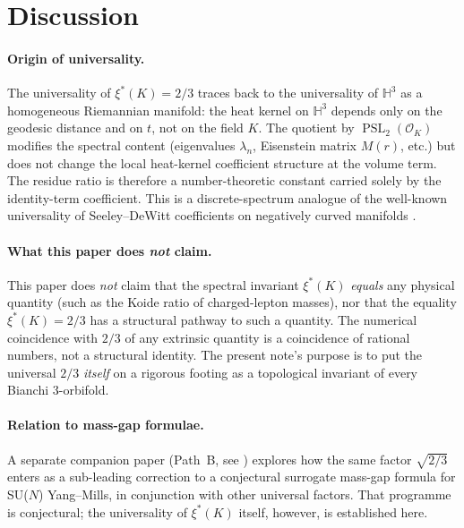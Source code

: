 \documentclass[11pt,a4paper,reqno]{amsart}
\theoremstyle{definition}
\DeclareMathOperator{\PSL}{PSL}
\newcommand{\OK}{\mathcal{O}_K}
\newcommand{\HH}{\mathbb{H}}
\newcommand{\xis}{\xi^{*}}
\begin{document}
\section{Discussion}\label{sec:discussion}

\paragraph{Origin of universality.}
The universality of $\xis(K)=2/3$ traces back to the universality of $\HH^3$ as a homogeneous Riemannian manifold: the heat kernel on $\HH^3$ depends only on the geodesic distance and on $t$, not on the field $K$. The quotient by $\PSL_2(\OK)$ modifies the spectral content (eigenvalues $\lambda_n$, Eisenstein matrix $M(r)$, etc.) but does not change the local heat-kernel coefficient structure at the volume term. The residue ratio is therefore a number-theoretic constant carried solely by the identity-term coefficient. This is a discrete-spectrum analogue of the well-known universality of Seeley--DeWitt coefficients on negatively curved manifolds \cite[\S2.2]{Vassilevich2003}.

\paragraph{What this paper does \emph{not} claim.}
This paper does \emph{not} claim that the spectral invariant $\xis(K)$ \emph{equals} any physical quantity (such as the Koide ratio of charged-lepton masses), nor that the equality $\xis(K)=2/3$ has a structural pathway to such a quantity. The numerical coincidence with $2/3$ of any extrinsic quantity is a coincidence of rational numbers, not a structural identity. The present note's purpose is to put the universal $2/3$ \emph{itself} on a rigorous footing as a topological invariant of every Bianchi 3-orbifold.

\paragraph{Relation to mass-gap formulae.}
A separate companion paper (Path~B, see \cite{Remondiere2026Selberg}) explores how the same factor $\sqrt{2/3}$ enters as a sub-leading correction to a conjectural surrogate mass-gap formula for SU($N$) Yang--Mills, in conjunction with other universal factors. That programme is conjectural; the universality of $\xis(K)$ itself, however, is established here.
\end{document}
